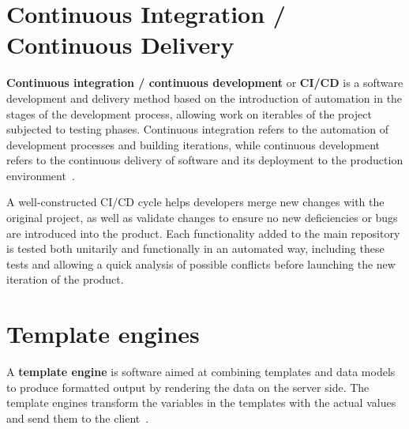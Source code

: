 \section{Continuous Integration / Continuous Delivery}

\nonzeroparskip \textbf{Continuous integration / continuous development} or \textbf{CI/CD} is a software development and delivery method based on the introduction of automation in the stages of the development process, allowing work on iterables of the project subjected to testing phases. Continuous integration refers to the automation of development processes and building iterations, while continuous development refers to the continuous delivery of software and its deployment to the production environment~\cite{redhat_cicd}.

\nonzeroparskip A well-constructed CI/CD cycle helps developers merge new changes with the original project, as well as validate changes to ensure no new deficiencies or bugs are introduced into the product. Each functionality added to the main repository is tested both unitarily and functionally in an automated way, including these tests and allowing a quick analysis of possible conflicts before launching the new iteration of the product.

\section{Template engines}

\nonzeroparskip A \textbf{template engine} is software aimed at combining templates and data models to produce formatted output by rendering the data on the server side. The template engines transform the variables in the templates with the actual values and send them to the client~\cite{template_engines}.
